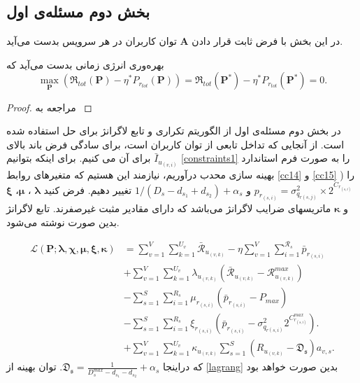 \subsection{بخش دوم مسئله‌ی اول}\label{secondsub}
در این بخش با فرض ثابت قرار دادن  $\boldsymbol{A}$
توان کاربران در هر سرویس بدست می‌آید.
\begin{theorem}\label{t2}
	بهره‌وری انرژی زمانی بدست می‌آید که
	\begin{equation}\label{q2}
		\max \limits_{\boldsymbol{P}} (\mathfrak{R}_{tot}(\boldsymbol{P}) - \eta^* P_{r_{tot}}(\boldsymbol{P}))=
		\mathfrak{R}_{tot}(\boldsymbol{P}^*) - \eta^* P_{r_{tot}}(\boldsymbol{P}^*) =0.
	\end{equation}
\end{theorem}
\begin{proof}
	مراجعه به  \cite[]{aaa}
\end{proof}
در بخش دوم مسئله‌ی اول از الگوریتم تکراری و تابع لاگرانژ برای حل استفاده شده است. 
از آنجایی که تداخل تابعی از توان کاربران است، برای سادگی فرض باند بالای $\bar{I}_{u_{(v,i)}}$ برای آن می کنیم. برای اینکه بتوانیم 
\eqref{constraints1}
را به صورت فرم استاندارد بهینه سازی محدب درآوریم، نیازمند این هستیم که متغیرهای روابط
\eqref{cc14} 
و
\eqref{cc15}
 را   ($p_{r_{(s,i)}} = \sigma_{q_{r(s,j)}}^2\times 2^{C_{r_{(s,i)}}}$ و $1/(D_{s}- d_{s_1} + d_{s_2})+\alpha_s$ تغییر دهیم.
فرض کنید $\boldsymbol{\lambda}$ ، $\boldsymbol{\mu}$، $\boldsymbol{\xi}$ و $\boldsymbol{ \kappa}$  ماتریسهای ضرایب لاگرانژ می‌باشد که دارای مقادیر مثبت غیر‌صفرند. تابع لاگرانژ بدین صورت نوشته می‌شود.

\begin{subequations}\label{lagrang}
	\begin{alignat}{4}
		\mathcal{L}(\boldsymbol{P}; \boldsymbol{\lambda}, \boldsymbol{\chi}, \boldsymbol{\mu}, \boldsymbol{ \xi}, \boldsymbol{ \kappa}) & = \sum\limits_{v=1}^{V} \sum\limits_{k=1}^{U_v}\mathcal{\bar{R}}_{u_{(v,k)}}
		- \eta \sum\limits_{v=1}^{V} \sum\limits_{i=1}^{\mathcal{R}_s}\bar{p}_{r_{(s,i)}}\\
		&+\sum\limits_{v=1}^{V} \sum\limits_{k=1}^{U_v} \lambda_{u_{(v,k)}} (\mathcal{\bar{R}}_{u_{(v,k)}}-\mathcal{R}_{u_{(v,k)}}^{max})\\
		&- \sum\limits_{s=1}^{S} \sum\limits_{i=1}^{R_s} \mu_{r_{(s,i)}} (\bar{p}_{r_{(s,i)}}-P_{max})\\
		&- \sum\limits_{s=1}^{S} \sum\limits_{i=1}^{R_s} \xi_{r_{(s,i)}} (\bar{p}_{r_{(s,i)}}-\sigma_{q_{r(s,i)}}^2 2^{C_{r_{(s,i)}}^{max}}).\\
		&+ \sum\limits_{v=1}^{V} \sum\limits_{k=1}^{U_v} \kappa_{u_{(v,k)}} \sum\limits_{s=1}^{S}(R_{u_{(v,k)}} -\mathfrak{D_s})a_{v,s}.
	\end{alignat}
\end{subequations}
که دراینجا $\mathfrak{D_s}=\frac{1}{D_{s}^{max}-d_{s_1}-d_{s_2}}+\alpha_s$.
توان بهینه از \eqref{lagrang}
بدین صورت خواهد بود

